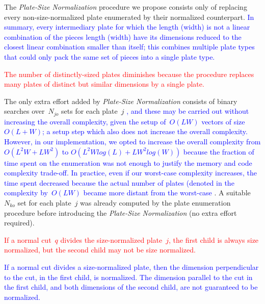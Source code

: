 \documentclass[ppgc,tese,english,formais,babel]{iiufrgs}
\newif\iffinalversion
\newcommand{\newtext}[1]{\iffinalversion%
#1%
\else%
\textcolor{blue}{#1}%
\fi%
}
\newcommand{\oldtext}[1]{\iffinalversion%
\else%
\textcolor{red}{#1}%
\fi%
}
\begin{document}
The \emph{Plate-Size Normalization} procedure we propose consists only of replacing every non-size-normalized plate enumerated by their normalized counterpart.
\newtext{In summary, every intermediary plate for which the length (width) is not a linear combination of the pieces length (width) have its dimensions reduced to the closest linear combination smaller than itself; this combines multiple plate types that could only pack the same set of pieces into a single plate type.}
\oldtext{The number of distinctly-sized plates diminishes because the procedure replaces many plates of distinct but similar dimensions by a single plate.}
The only extra effort added by \emph{Plate-Size Normalization} consists of binary searches over~\(N_{jo}\) sets for each plate~\(j\)\newtext{, and these may be carried out without increasing the overall complexity, given the setup of~\(O(LW)\) vectors of size \(O(L + W)\); a setup step which also does not increase the overall complexity. However, in our implementation, we opted to increase the overall complexity from \(O(L^2W + LW^2)\) to \(O(L^2Wlog(L) + LW^2log(W))\) because the fraction of time spent on the enumeration was not enough to justify the memory and code complexity trade-off. In practice, even if our worst-case complexity increases, the time spent decreased because the actual number of plates (denoted in the complexity by~\(O(LW)\) became more distant from the worst-case}.
A suitable \(N_{ko}\) set for each plate~\(j\) was already computed by the plate enumeration procedure before introducing the \emph{Plate-Size Normalization} (no extra effort required).

\begin{remark}
\oldtext{If a normal cut~\(q\) divides the size-normalized plate~\(j\), the first child is always size normalized, but the second child may not be size normalized.}
\newtext{If a normal cut divides a size-normalized plate, then the dimension perpendicular to the cut, in the first child, is normalized. The dimension parallel to the cut in the first child, and both dimensions of the second child, are not guaranteed to be normalized.}
\end{remark}


\end{document}
